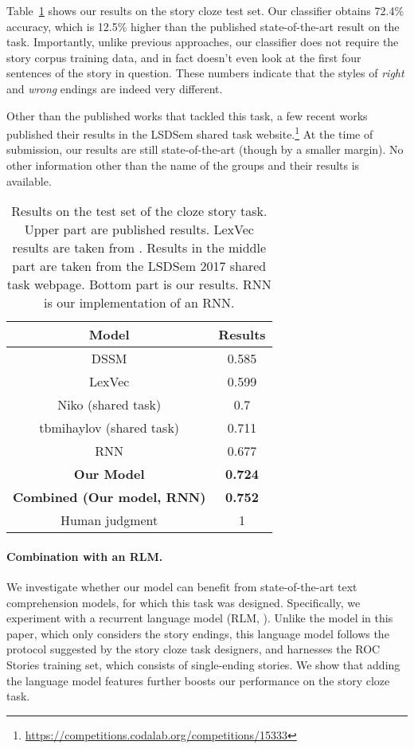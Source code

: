 \documentclass[11pt,a4paper]{article}
\newcommand{\tabref}[1]{Table~\ref{#1}}
\begin{document}
\tabref{cloze_results} shows our results on the story cloze test set. Our classifier obtains 72.4\% accuracy, which is 12.5\% higher than the published state-of-the-art result on the task.
Importantly, unlike previous approaches, our classifier does not require the story corpus training data, and in fact doesn't even look at the first four sentences of the story in question.
These numbers indicate that the styles of {\it right} and {\it wrong} endings are indeed very different.

Other than the published works that tackled this task, a few  recent works published their results in the LSDSem shared task website.\footnote{\url{https://competitions.codalab.org/competitions/15333}} 
At the time of submission, our results are still state-of-the-art (though by a  smaller margin). 
No other information other than the name of the groups and their results is available.

\begin{table}[!t]
\begin{center}
\begin{tabular}{|c|c|} \hline
{\bf Model} & {\bf Results} \\ \hline
{DSSM} \cite{Mostafazadeh:2016} & 0.585 \\ \hline
{ LexVec} \cite{Salle:2016} & 0.599 \\ \hline\hline
{ Niko (shared task)}	& 0.7\\ \hline
{ tbmihaylov (shared task)} & 0.711\\ \hline\hline
{RNN}		& 0.677 \\ \hline
{\bf Our Model} & {\bf 0.724} \\ \hline
{\bf Combined (Our model, RNN)} & {\bf 0.752} \\ \hline\hline
Human judgment & 1 \\ \hline
\end{tabular}
\end{center}
\caption{\label{cloze_results}
Results on the test set of the cloze story task. 
Upper part are published results.
LexVec results are taken from \cite{Speer:2016}.
Results in the middle part are taken from the LSDSem 2017 shared task webpage.
Bottom part is our results.
RNN is our implementation of an RNN.
}
\end{table}


\paragraph{Combination with an RLM.}
We investigate whether our model can benefit from state-of-the-art text comprehension models, for which this task was designed. 
Specifically, we experiment with a recurrent language model (RLM, \citet{mikolov2010recurrent}). %
Unlike the model in this paper, which only considers the story endings, this language model follows the protocol suggested by the story cloze task designers, and harnesses the ROC Stories training set, which consists of single-ending stories. 
We show that adding the language model features  further boosts our performance on the story cloze task.
\end{document}

